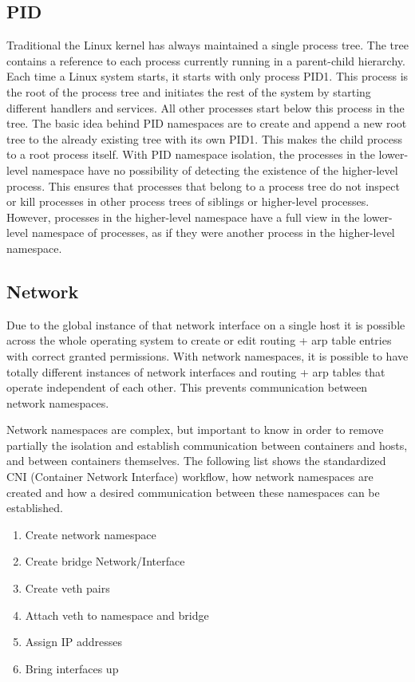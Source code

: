 \subsection{PID}
\label{sec:intro:containerization:linux_namespaces:pid_namespaces}
Traditional the Linux kernel has always maintained a single process tree. The tree contains a reference to each process currently running in a parent-child hierarchy. 
Each time a Linux system starts, it starts with only process PID1. This process is the root of the process tree and initiates the rest of the system by starting different handlers and services. All other processes start below this process in the tree. The basic idea behind PID namespaces are to create and append a new root tree to the already existing tree with its own PID1. This makes the child process to a root process itself.
With PID namespace isolation, the processes in the lower-level namespace have no possibility of detecting the existence of the higher-level process. This ensures that processes that belong to a process tree do not inspect or kill processes in other process trees of siblings or higher-level processes. However, processes in the higher-level namespace have a full view in the lower-level namespace of processes, as if they were another process in the higher-level namespace.

\subsection{Network}
\label{sec:intro:containerization:linux_namespaces:network_namespaces}
Due to the global instance of that network interface on a single host it is possible across the whole operating system to create or edit routing + arp table entries with correct granted permissions. With network namespaces, it is possible to have totally different instances of network interfaces and routing + arp tables that operate independent of each other. This prevents communication between network namespaces.
 
Network namespaces are complex, but important to know in order to remove partially the isolation and establish communication between containers and hosts, and between containers themselves. 
The following list shows the standardized CNI (Container Network Interface) workflow, how network namespaces are created and how a desired communication between these namespaces can be established.

\begin{enumerate}
\item Create network namespace
\item Create bridge Network/Interface
\item Create veth pairs
\item Attach veth to namespace and bridge
\item Assign IP addresses
\item Bring interfaces up
\end{enumerate}

